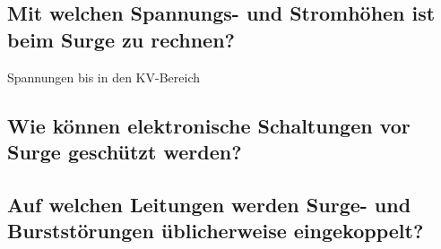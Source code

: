 \subsection{Mit welchen Spannungs- und Stromhöhen ist beim Surge zu rechnen?}
Spannungen bis in den KV-Bereich

\subsection{Wie können elektronische Schaltungen vor Surge geschützt werden?}

\subsection{Auf welchen Leitungen werden Surge- und Burststörungen üblicherweise eingekoppelt?}

\pagebreak
